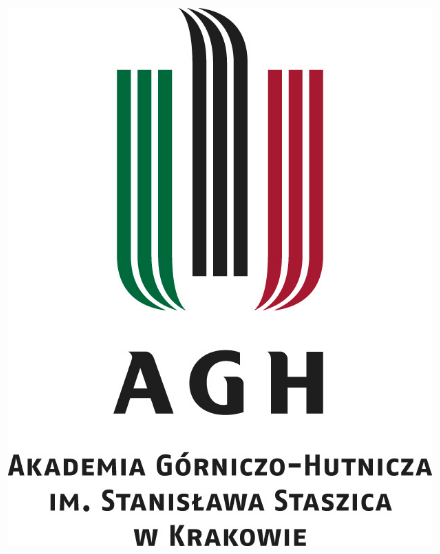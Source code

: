 \documentclass[a4paper,11pt]{article}
\begin{document}
\begin{figure}[!htb]
	\centerline{\includegraphics[scale=1]{agh_logo.jpg}}
\end{figure}
\end{document}
